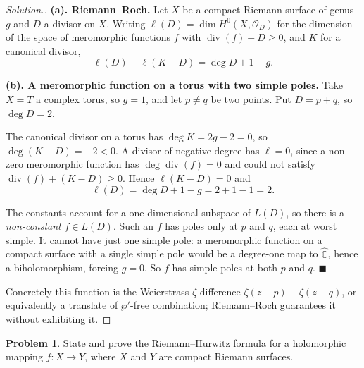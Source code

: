 \documentclass[11pt,a4paper]{article}
\theoremstyle{definition}
\newtheorem{problemx}{Problem}[section]
\newenvironment{problem}{\begin{problemx}}{\end{problemx}}
\newenvironment{solution}
  {\renewcommand{\qedsymbol}{}\begin{proof}[\textit{Solution}.]}
  {\end{proof}}
\begin{document}
\begin{solution}
\textbf{(a). Riemann--Roch.} Let $X$ be a compact Riemann surface of genus $g$ and
$D$ a divisor on $X$. Writing $\ell(D) = \dim H^{0}(X,\mathcal{O}_D)$ for the
dimension of the space of meromorphic functions $f$ with $\operatorname{div}(f) + D \geq 0$,
and $K$ for a canonical divisor,
$$\ell(D) - \ell(K-D) = \deg D + 1 - g .$$

\textbf{(b). A meromorphic function on a torus with two simple poles.} Take
$X = T$ a complex torus, so $g = 1$, and let $p \neq q$ be two points. Put
$D = p + q$, so $\deg D = 2$.

The canonical divisor on a torus has $\deg K = 2g-2 = 0$, so $\deg(K-D) = -2 < 0$.
A divisor of negative degree has $\ell = 0$, since a non-zero meromorphic function
has $\deg\operatorname{div}(f) = 0$ and could not satisfy
$\operatorname{div}(f) + (K-D) \geq 0$. Hence $\ell(K-D) = 0$ and
$$\ell(D) = \deg D + 1 - g = 2 + 1 - 1 = 2 .$$

The constants account for a one-dimensional subspace of $L(D)$, so there is a
\emph{non-constant} $f \in L(D)$. Such an $f$ has poles only at $p$ and $q$, each
at worst simple. It cannot have just one simple pole: a meromorphic function on a
compact surface with a single simple pole would be a degree-one map to
$\widehat{\mathbb{C}}$, hence a biholomorphism, forcing $g = 0$. So $f$ has simple
poles at both $p$ and $q$. $\blacksquare$

Concretely this function is the Weierstrass $\zeta$-difference
$\zeta(z-p) - \zeta(z-q)$, or equivalently a translate of $\wp'$-free combination;
Riemann--Roch guarantees it without exhibiting it.
\end{solution}


\begin{problem}
State and prove the Riemann--Hurwitz formula for a holomorphic mapping
$f : X \rightarrow Y$, where $X$ and $Y$ are compact Riemann surfaces.
\end{problem}
\end{document}
